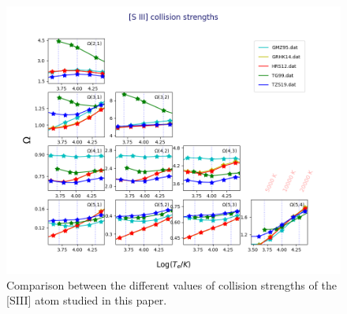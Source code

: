 \documentclass[fleqn,usenatbib]{mnras}
\begin{document}
\begin{figure}
\includegraphics[width=\textwidth]{omega_siii_zoom.png}
\caption{Comparison between the different values of collision strengths of the [S\thinspace III] atom studied in this paper.}
\label{fig:omega_siii_zoom }
\end{figure}
\end{document}
